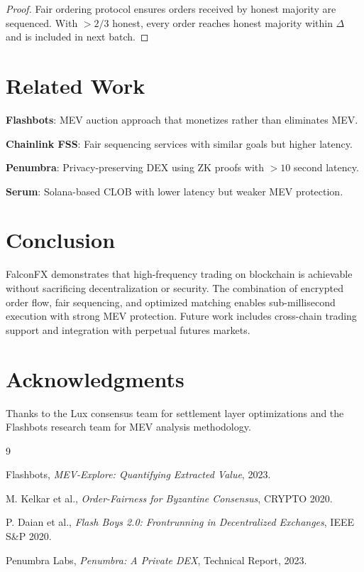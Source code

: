 \documentclass[11pt,a4paper]{article}
\begin{document}
\begin{proof}
Fair ordering protocol ensures orders received by honest majority are sequenced. With $> 2/3$ honest, every order reaches honest majority within $\Delta$ and is included in next batch.
\end{proof}

\section{Related Work}

\textbf{Flashbots}: MEV auction approach that monetizes rather than eliminates MEV.

\textbf{Chainlink FSS}: Fair sequencing services with similar goals but higher latency.

\textbf{Penumbra}: Privacy-preserving DEX using ZK proofs with $>10$ second latency.

\textbf{Serum}: Solana-based CLOB with lower latency but weaker MEV protection.

\section{Conclusion}

FalconFX demonstrates that high-frequency trading on blockchain is achievable without sacrificing decentralization or security. The combination of encrypted order flow, fair sequencing, and optimized matching enables sub-millisecond execution with strong MEV protection. Future work includes cross-chain trading support and integration with perpetual futures markets.

\section*{Acknowledgments}

Thanks to the Lux consensus team for settlement layer optimizations and the Flashbots research team for MEV analysis methodology.


\begin{thebibliography}{9}

 Flashbots, \textit{MEV-Explore: Quantifying Extracted Value}, 2023.

 M. Kelkar et al., \textit{Order-Fairness for Byzantine Consensus}, CRYPTO 2020.

 P. Daian et al., \textit{Flash Boys 2.0: Frontrunning in Decentralized Exchanges}, IEEE S\&P 2020.

 Penumbra Labs, \textit{Penumbra: A Private DEX}, Technical Report, 2023.

\end{thebibliography}
\end{document}
